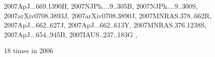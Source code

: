 \documentclass[12pt]{article}
\begin{document}
\begin{description}
{2007ApJ...669.1390H,%
2007NJPh....9..305B,%
2007NJPh....9..300S,%
2007arXiv0708.3893J,%
2007arXiv0708.3890J,%
2007MNRAS.378..662R,%
2007ApJ...662..627J,%
2007ApJ...662..613Y,%
2007MNRAS.376.1238S,%
2007ApJ...654..945B,%
2007IAUS..237..183G%
},\item
18 times in 2006 \citep{
2006ApJ...653..558O,%
2006A&A...459..935H,%
2006A&A...457..371F,%
2006MNRAS.370..529D,%
2006PhFl...18g5106H,%
2006MNRAS.370L..71J,%
2006IAUJD...8E..62B,%
2006AN....327..461B,%
2006A&A...448L..33S,%
2006MNRAS.370..415M,%
2006MNRAS.373..643S,%
}
\end{description}
\end{document}
